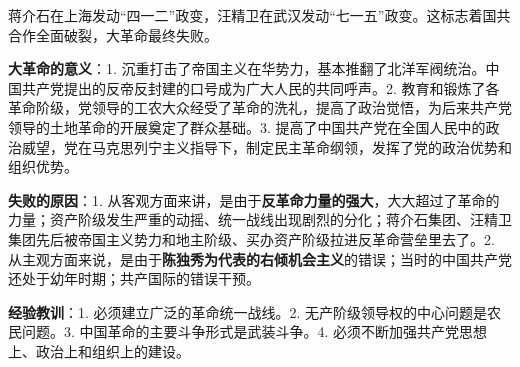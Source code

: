 蒋介石在上海发动``四一二''政变，汪精卫在武汉发动``七一五''政变。这标志着国共合作全面破裂，大革命最终失败。

\textbf{{大革命的意义}}：1.{
}沉重打击了帝国主义在华势力，基本推翻了北洋军阀统治。中国共产党提出的反帝反封建的口号成为广大人民的共同呼声。2.{
}教育和锻炼了各革命阶级，党领导的工农大众经受了革命的洗礼，提高了政治觉悟，为后来共产党领导的土地革命的开展奠定了群众基础。3.{
}提高了中国共产党在全国人民中的政治威望，党在马克思列宁主义指导下，制定民主革命纲领，发挥了党的政治优势和组织优势。

\textbf{{失败的原因}}{：1.
从客观方面来讲，是由于}\textbf{反革命力量的强大}{，大大超过了革命的力量；资产阶级发生严重的动摇、统一战线出现剧烈的分化；蒋介石集团、汪精卫集团先后被帝国主义势力和地主阶级、买办资产阶级拉进反革命营垒里去了。2.
从主观方面来说，是由于}\textbf{陈独秀为代表的右倾机会主义}{的错误；当时的中国共产党还处于幼年时期；共产国际的错误干预。}

\textbf{{经验教训}}{：1. 必须建立广泛的革命统一战线。2.
无产阶级领导权的中心问题是农民问题。3.
中国革命的主要斗争形式是武装斗争。4.
必须不断加强共产党思想上、政治上和组织上的建设。}
